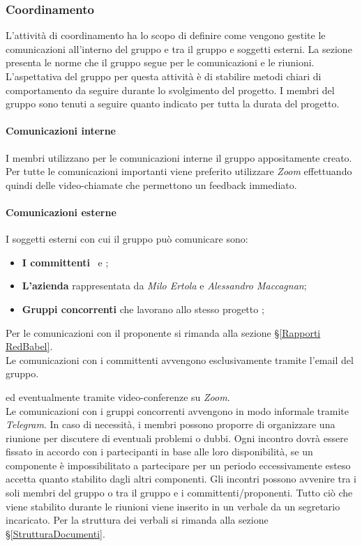 \subsubsection{Coordinamento}
\label{PO_Coordinamento_Scopo}
L'attività di coordinamento ha lo scopo di definire come vengono gestite le comunicazioni all'interno del gruppo {\Gruppo} e tra il gruppo e soggetti esterni.
La sezione presenta le norme che il gruppo segue per le comunicazioni e le riunioni.
L'aspettativa del gruppo per questa attività è di stabilire metodi chiari di comportamento da seguire durante lo svolgimento del progetto.
I membri del gruppo sono tenuti a seguire quanto indicato per tutta la durata del progetto.
\paragraph*{Comunicazioni interne}
I membri utilizzano per le comunicazioni interne il gruppo  appositamente creato. Per tutte le comunicazioni importanti viene preferito utilizzare \textit{Zoom} effettuando quindi delle video-chiamate che permettono un feedback immediato.
\paragraph*{Comunicazioni esterne}
I soggetti esterni con cui il gruppo può comunicare sono: 
\begin{itemize}
	\item \textbf{I committenti} \VT\ e \CR;
	\item \textbf{L'azienda \Proponente} rappresentata da \textit{Milo Ertola} e \textit{Alessandro Maccagnan};
	\item \textbf{Gruppi concorrenti} che lavorano allo stesso progetto \NomeProgetto;
\end{itemize}
Per le comunicazioni con il proponente si rimanda alla sezione \S\ref{Rapporti RedBabel}.\\
Le comunicazioni con i committenti avvengono esclusivamente tramite l'email del gruppo.
\begin{center}
	 \textbf{\Mail} 
\end{center} ed eventualmente tramite video-conferenze su \textit{Zoom}.\\
Le comunicazioni con i gruppi concorrenti avvengono in modo informale tramite \textit{Telegram}.
In caso di necessità, i membri possono proporre di organizzare una riunione per discutere di eventuali problemi o dubbi. Ogni incontro dovrà essere fissato in accordo con i partecipanti in base alle loro disponibilità, se un componente è impossibilitato a partecipare per un periodo eccessivamente esteso accetta quanto stabilito dagli altri componenti. Gli incontri possono avvenire tra i soli membri del gruppo o tra il gruppo e i committenti/proponenti. 
Tutto ciò che viene stabilito durante le riunioni viene inserito in un verbale da un segretario incaricato. Per la struttura dei verbali si rimanda alla sezione \S\ref{StrutturaDocumenti}.
